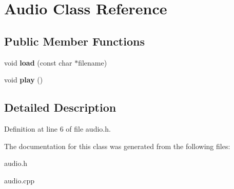\hypertarget{classAudio}{}\section{Audio Class Reference}
\label{classAudio}
\subsection*{Public Member Functions}
\begin{DoxyCompactItemize}
\item 
\mbox{\label{classAudio_a27b173bbcb7e2b7dc9f5a8a87d02f570}} 
void {\bfseries load} (const char $\ast$filename)
\item 
\mbox{\label{classAudio_a2916f9015031bee9abb98adf0d83e7ee}} 
void {\bfseries play} ()
\end{DoxyCompactItemize}


\subsection{Detailed Description}


Definition at line 6 of file audio.\+h.



The documentation for this class was generated from the following files\+:\begin{DoxyCompactItemize}
\item 
audio.\+h\item 
audio.\+cpp\end{DoxyCompactItemize}
